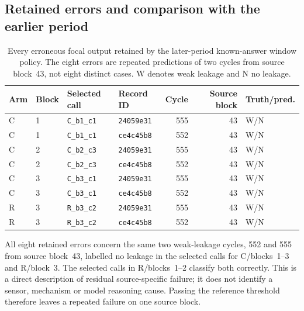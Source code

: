 \subsection{Retained errors and comparison with the earlier period}
\begin{table}[htbp]\centering\small
\caption{Every erroneous focal output retained by the later-period known-answer window policy. The eight errors are repeated predictions of two cycles from source block~43, not eight distinct cases. W denotes weak leakage and N no leakage.}
\label{tab:canary_stability_errors}
\begin{tabular}{@{}llllrrl@{}}\toprule
Arm & Block & Selected call & Record ID & Cycle & Source block & Truth/pred. \\\midrule
C & 1 & \texttt{C\_b1\_c1} & \texttt{24059e31} & 555 & 43 & W/N \\
C & 1 & \texttt{C\_b1\_c1} & \texttt{ce4c45b8} & 552 & 43 & W/N \\
C & 2 & \texttt{C\_b2\_c3} & \texttt{24059e31} & 555 & 43 & W/N \\
C & 2 & \texttt{C\_b2\_c3} & \texttt{ce4c45b8} & 552 & 43 & W/N \\
C & 3 & \texttt{C\_b3\_c1} & \texttt{24059e31} & 555 & 43 & W/N \\
C & 3 & \texttt{C\_b3\_c1} & \texttt{ce4c45b8} & 552 & 43 & W/N \\
R & 3 & \texttt{R\_b3\_c2} & \texttt{24059e31} & 555 & 43 & W/N \\
R & 3 & \texttt{R\_b3\_c2} & \texttt{ce4c45b8} & 552 & 43 & W/N \\
\bottomrule\end{tabular}\end{table}

All eight retained errors concern the same two weak-leakage cycles, 552 and 555 from source block~43, labelled no leakage in the selected calls for C/blocks~1--3 and R/block~3. The selected calls in R/blocks~1--2 classify both correctly. This is a direct description of residual source-specific failure; it does not identify a sensor, mechanism or model reasoning cause. Passing the reference threshold therefore leaves a repeated failure on one source block.

